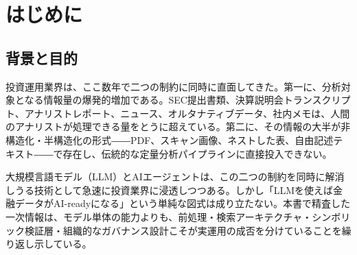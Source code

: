 \section{はじめに}
\label{sec:introduction}

\subsection{背景と目的}

投資運用業界は、ここ数年で二つの制約に同時に直面してきた。第一に、分析対象となる情報量の爆発的増加である。SEC提出書類、決算説明会トランスクリプト、アナリストレポート、ニュース、オルタナティブデータ、社内メモは、人間のアナリストが処理できる量をとうに超えている。第二に、その情報の大半が非構造化・半構造化の形式――PDF、スキャン画像、ネストした表、自由記述テキスト――で存在し、伝統的な定量分析パイプラインに直接投入できない。

大規模言語モデル（LLM）とAIエージェントは、この二つの制約を同時に解消しうる技術として急速に投資業界に浸透しつつある。しかし「LLMを使えば金融データがAI-readyになる」という単純な図式は成り立たない。本書で精査した一次情報は、モデル単体の能力よりも、前処理・検索アーキテクチャ・シンボリック検証層・組織的なガバナンス設計こそが実運用の成否を分けていることを繰り返し示している。

